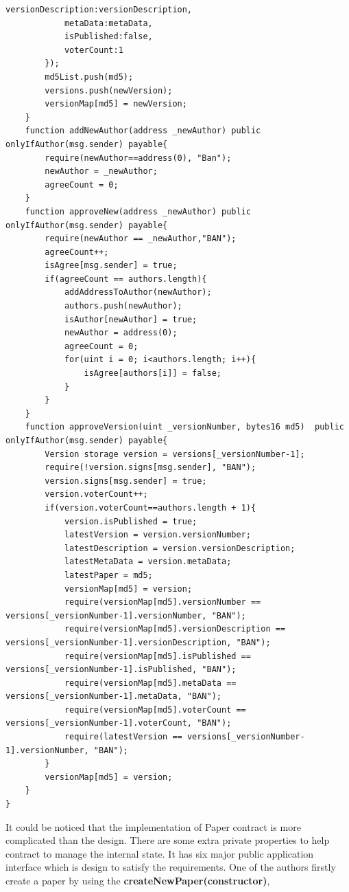 \documentclass[openany,12pt]{ecsthesis}      %
\begin{document}
\begin{lstlisting}[language=Solidity]
            versionDescription:versionDescription,
            metaData:metaData,
            isPublished:false,
            voterCount:1
        });
        md5List.push(md5);
        versions.push(newVersion);
        versionMap[md5] = newVersion;
    }
    function addNewAuthor(address _newAuthor) public onlyIfAuthor(msg.sender) payable{
        require(newAuthor==address(0), "Ban");
        newAuthor = _newAuthor;
        agreeCount = 0;
    }
    function approveNew(address _newAuthor) public onlyIfAuthor(msg.sender) payable{
        require(newAuthor == _newAuthor,"BAN");
        agreeCount++;
        isAgree[msg.sender] = true;
        if(agreeCount == authors.length){
            addAddressToAuthor(newAuthor);
            authors.push(newAuthor);
            isAuthor[newAuthor] = true;
            newAuthor = address(0);
            agreeCount = 0;
            for(uint i = 0; i<authors.length; i++){
                isAgree[authors[i]] = false;
            }
        }
    }
    function approveVersion(uint _versionNumber, bytes16 md5)  public onlyIfAuthor(msg.sender) payable{
        Version storage version = versions[_versionNumber-1];
        require(!version.signs[msg.sender], "BAN");
        version.signs[msg.sender] = true;
        version.voterCount++;
        if(version.voterCount==authors.length + 1){
            version.isPublished = true;
            latestVersion = version.versionNumber;
            latestDescription = version.versionDescription;
            latestMetaData = version.metaData;
            latestPaper = md5;
            versionMap[md5] = version;
            require(versionMap[md5].versionNumber == versions[_versionNumber-1].versionNumber, "BAN");
            require(versionMap[md5].versionDescription == versions[_versionNumber-1].versionDescription, "BAN");
            require(versionMap[md5].isPublished == versions[_versionNumber-1].isPublished, "BAN");
            require(versionMap[md5].metaData == versions[_versionNumber-1].metaData, "BAN");
            require(versionMap[md5].voterCount == versions[_versionNumber-1].voterCount, "BAN");
            require(latestVersion == versions[_versionNumber-1].versionNumber, "BAN");
        }
        versionMap[md5] = version;
    }
} 
\end{lstlisting}
It could be noticed that the implementation of Paper contract is more complicated than the design. 
There are some extra private properties to help contract to manage the internal state. 
It has six major public application interface which is design to satisfy the requirements.
One of the authors firstly create a paper by using the \textbf{createNewPaper(constructor)}, 
\end{document}
